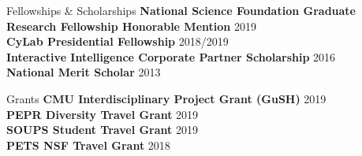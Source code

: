 \documentclass{resume} %
\begin{document}
\begin{rSection}{Fellowships \& Scholarships}
	{\bf National Science Foundation Graduate Research Fellowship Honorable Mention} \hfill 2019 \\ 
	{\bf CyLab Presidential Fellowship} \hfill 2018/2019 \\ 
	{\bf Interactive Intelligence Corporate Partner Scholarship} \hfill 2016 \\ 
	{\bf National Merit Scholar} \hfill 2013 \\ 

\end{rSection}

\begin{rSection}{Grants}
	{\bf CMU Interdisciplinary Project Grant (GuSH)} \hfill 2019 \\ 
	{\bf PEPR Diversity Travel Grant} \hfill 2019 \\ 
	{\bf SOUPS Student Travel Grant} \hfill 2019 \\ 
	{\bf PETS NSF Travel Grant} \hfill 2018 \\ 
\end{rSection}
	
\end{document}
